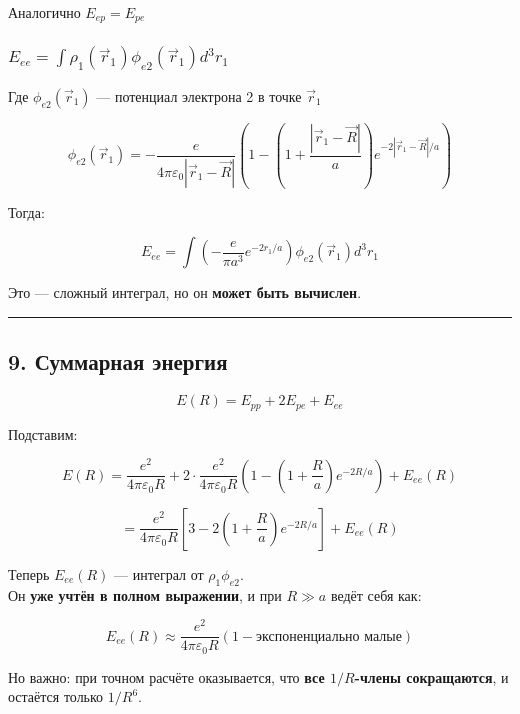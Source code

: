 \documentclass[11pt]{article}
\begin{document}
Аналогично \(E_{ep} = E_{pe}\)

\subsubsection{\texorpdfstring{\(E_{ee} = \int \rho_1(\vec{r}_1) \phi_{e2}(\vec{r}_1) d^3r_1\)}{E\_\{ee\} = \textbackslash{}int \textbackslash{}rho\_1(\textbackslash{}vec\{r\}\_1) \textbackslash{}phi\_\{e2\}(\textbackslash{}vec\{r\}\_1) d\^{}3r\_1}}\label{e_ee-int-rho_1vecr_1-phi_e2vecr_1-d3r_1}

Где \(\phi_{e2}(\vec{r}_1)\) --- потенциал электрона 2 в точке
\(\vec{r}_1\)

\[
\phi_{e2}(\vec{r}_1) = -\frac{e}{4\pi\varepsilon_0 |\vec{r}_1 - \vec{R}|} \left( 1 - \left(1 + \frac{|\vec{r}_1 - \vec{R}|}{a}\right) e^{-2|\vec{r}_1 - \vec{R}|/a} \right)
\]

Тогда:

\[
E_{ee} = \int \left( -\frac{e}{\pi a^3} e^{-2r_1/a} \right) \phi_{e2}(\vec{r}_1) d^3r_1
\]

Это --- сложный интеграл, но он \textbf{может быть вычислен}.

\begin{center}\rule{0.5\linewidth}{\linethickness}\end{center}

\subsection{9. Суммарная
энергия}\label{ux441ux443ux43cux43cux430ux440ux43dux430ux44f-ux44dux43dux435ux440ux433ux438ux44f}

\[
E(R) = E_{pp} + 2E_{pe} + E_{ee}
\]

Подставим:

\[
E(R) = \frac{e^2}{4\pi\varepsilon_0 R} + 2 \cdot \frac{e^2}{4\pi\varepsilon_0 R} \left( 1 - \left(1 + \frac{R}{a}\right) e^{-2R/a} \right) + E_{ee}(R)
\]

\[
= \frac{e^2}{4\pi\varepsilon_0 R} \left[ 3 - 2\left(1 + \frac{R}{a}\right) e^{-2R/a} \right] + E_{ee}(R)
\]

Теперь \(E_{ee}(R)\) --- интеграл от \(\rho_1 \phi_{e2}\).\\
Он \textbf{уже учтён в полном выражении}, и при \(R \gg a\) ведёт себя
как:

\[
E_{ee}(R) \approx \frac{e^2}{4\pi\varepsilon_0 R} \left( 1 - \text{экспоненциально малые} \right)
\]

Но важно: при точном расчёте оказывается, что \textbf{все \(1/R\)-члены
сокращаются}, и остаётся только \(1/R^6\).
\end{document}

